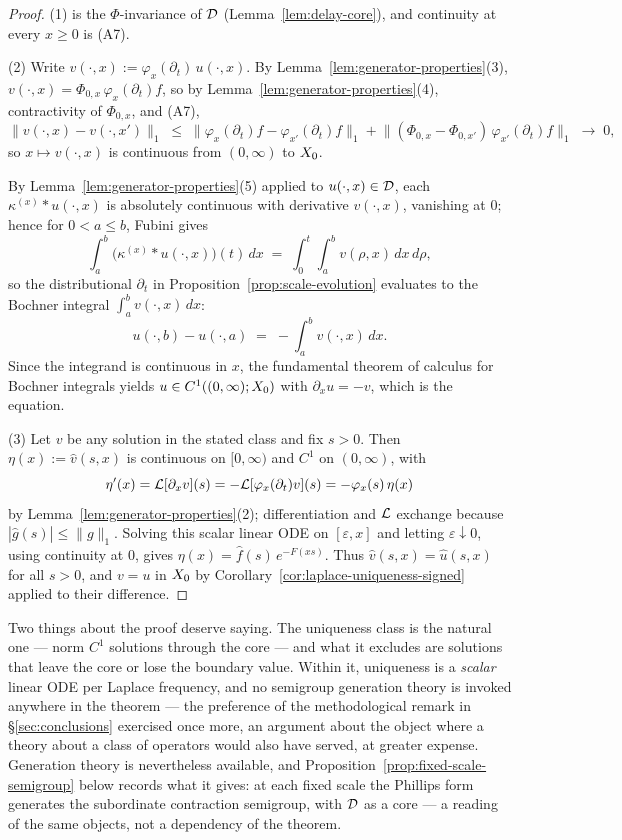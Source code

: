 \begin{proof}
(1) is the $\Phi$-invariance of $\mathcal{D}$ (Lemma~\ref{lem:delay-core}), and continuity at every
$x \ge 0$ is (A7).

(2) Write $v(\cdot, x) := \varphi_x(\partial_t)\, u(\cdot, x)$. By
Lemma~\ref{lem:generator-properties}(3), $v(\cdot, x) = \Phi_{0,x}\,\varphi_x(\partial_t) f$,
so by Lemma~\ref{lem:generator-properties}(4), contractivity of $\Phi_{0,x}$, and (A7),
\[
  \|v(\cdot,x) - v(\cdot,x')\|_1
  \;\le\; \bigl\|\varphi_x(\partial_t)f - \varphi_{x'}(\partial_t)f\bigr\|_1
  + \bigl\|(\Phi_{0,x} - \Phi_{0,x'})\,\varphi_{x'}(\partial_t)f\bigr\|_1
  \;\longrightarrow\; 0,
\]
so $x \mapsto v(\cdot, x)$ is continuous from $(0,\infty)$ to $X_0$.

By Lemma~\ref{lem:generator-properties}(5) applied to $u(\cdot,x) \in \mathcal{D}$, each
$\kappa^{(x)} * u(\cdot, x)$ is absolutely continuous with derivative $v(\cdot, x)$,
vanishing at $0$; hence for $0 < a \le b$, Fubini gives
\[
  \int_a^b \bigl(\kappa^{(x)} * u(\cdot, x)\bigr)(t)\,dx
  \;=\; \int_0^t \int_a^b v(\rho, x)\,dx\,d\rho ,
\]
so the distributional $\partial_t$ in Proposition~\ref{prop:scale-evolution} evaluates to the
Bochner integral $\int_a^b v(\cdot, x)\,dx$:
\[
  u(\cdot, b) - u(\cdot, a) \;=\; -\int_a^b v(\cdot, x)\,dx .
\]
Since the integrand is continuous in $x$, the fundamental theorem of calculus for Bochner
integrals yields $u \in C^1((0,\infty); X_0)$ with $\partial_x u = -v$, which is the
equation.

(3) Let $v$ be any solution in the stated class and fix $s > 0$. Then
$\eta(x) := \hat v(s, x)$ is continuous on $[0,\infty)$ and $C^1$ on $(0,\infty)$, with
\[
  \eta'(x) = \mathcal{L}[\partial_x v](s) = -\mathcal{L}[\varphi_x(\partial_t) v](s) = -\varphi_x(s)\,\eta(x)
\]
by Lemma~\ref{lem:generator-properties}(2); differentiation and $\mathcal{L}$ exchange because
$|\hat g(s)| \le \|g\|_1$. Solving this scalar linear ODE on $[\varepsilon, x]$ and letting
$\varepsilon \downarrow 0$, using continuity at $0$, gives $\eta(x) = \hat f(s)\, e^{-F(xs)}$.
Thus $\hat v(s, x) = \hat u(s, x)$ for all $s > 0$, and $v = u$ in $X_0$ by
Corollary~\ref{cor:laplace-uniqueness-signed} applied to their difference.
\end{proof}

Two things about the proof deserve saying. The uniqueness class is the natural one --- norm
$C^1$ solutions through the core --- and what it excludes are solutions that leave the core
or lose the boundary value. Within it, uniqueness is a \emph{scalar} linear ODE per Laplace
frequency, and no semigroup generation theory is invoked anywhere in the theorem --- the
preference of the methodological remark in \S\ref{sec:conclusions} exercised once more, an
argument about the object where a theory about a class of operators would also have served,
at greater expense. Generation
theory is nevertheless available, and Proposition~\ref{prop:fixed-scale-semigroup} below
records what it gives: at each fixed scale the Phillips form generates the subordinate
contraction semigroup, with $\mathcal{D}$ as a core --- a reading of the same objects, not a
dependency of the theorem.

